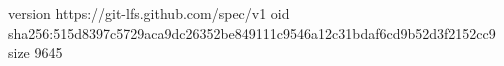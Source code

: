 version https://git-lfs.github.com/spec/v1
oid sha256:515d8397c5729aca9dc26352be849111c9546a12c31bdaf6cd9b52d3f2152cc9
size 9645
